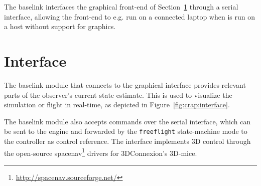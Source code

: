             The baselink interfaces the graphical front-end of Section~\ref{sec:crap:interface}
            through a serial interface, allowing the front-end to e.g. run on
            a connected laptop when \crap is run on a host without support for graphics.

    \section{Interface}
    \label{sec:crap:interface}
        The baselink module that connects to the graphical interface
        provides relevant parts of the observer's current state estimate.
        This is used to visualize the simulation or flight in real-time, as
        depicted in Figure~\ref{fig:crap:interface}.

        The baselink module also accepts commands over the serial interface,
        which can be sent to the \crap engine and forwarded by the \texttt{freeflight}
        state-machine mode to the controller as control reference.
        The interface implements 3D control through the open-source
        spacenav\footnote{\url{http://spacenav.sourceforge.net/}} drivers
        for 3DConnexion's 3D-mice.

